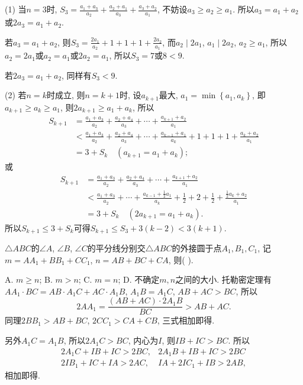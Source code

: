 (1) 当$n=3$时, $S_{3}=\frac{a_{1}+a_{3}}{a_{2}}+\frac{a_{2}+a_{1}}{a_{3}}+\frac{a_{3}+a_{2}}{a_{1}}$,
不妨设$a_{3}\ge a_{2}\ge a_{1}$. 所以$a_{3}=a_{1}+a_{2}$或$2a_{3}=a_{1}+a_{2}$.

若$a_{3}=a_{1}+a_{2}$, 则$S_{3}=\frac{2a_{1}}{a_{2}}+1+1+1+\frac{2a_{2}}{a_{1}}$,
而$a_{2}\mid2a_{1}$, $a_{1}\mid2a_{2}$, $a_{2}\ge a_{1}$, 所以$a_{2}=2a_{1}$或$a_{2}=a_{1}$或$2a_{2}=a_{1}$,
所以$S_{3}=7$或$8<9$.

若$2a_{3}=a_{1}+a_{2}$, 同样有$S_{3}<9$.

(2) 若$n=k$时成立, 则$n=k+1$时, 设$a_{k+1}$最大, $a_{1}=\min\left\{ a_{1},a_{k}\right\} $,
即$a_{k+1}\ge a_{k}\ge a_{1}$, 则$2a_{k+1}\ge a_{1}+a_{k}$, 所以
\[
\begin{aligned}S_{k+1} & =\frac{a_{1}+a_{3}}{a_{2}}+\frac{a_{2}+a_{4}}{a_{3}}+\cdots+\frac{a_{k+1}+a_{2}}{a_{1}}\\
 & <\frac{a_{1}+a_{3}}{a_{2}}+\frac{a_{2}+a_{4}}{a_{3}}+\cdots+\frac{a_{k-1}+a_{1}}{a_{k}}+1+1+1+\frac{a_{k}+a_{2}}{a_{1}}\\
 & =3+S_{k}\quad\left(a_{k+1}=a_{1}+a_{k}\right);
\end{aligned}
\]
或
\[
\begin{aligned}S_{k+1} & =\frac{a_{1}+a_{3}}{a_{2}}+\frac{a_{2}+a_{4}}{a_{3}}+\cdots+\frac{a_{k+1}+a_{2}}{a_{1}}\\
 & <\frac{a_{1}+a_{3}}{a_{2}}+\cdots+\frac{a_{k-1}+\frac{1}{2}a_{1}}{a_{k}}+\frac{1}{2}+2+\frac{1}{2}+\frac{\frac{1}{2}a_{k}+a_{2}}{a_{1}}\\
 & =3+S_{k}\quad\left(2a_{k+1}=a_{1}+a_{k}\right).
\end{aligned}
\]
所以$S_{k+1}\le3+S_{k}$可得$S_{k+1}\le S_{3}+3\left(k-2\right)<3\left(k+1\right)$.
\ea

\bq{}{}
$\triangle ABC$的$\angle A$, $\angle B$, $\angle C$的平分线分别交$\triangle ABC$的外接圆于点$A_{1},B_{1},C_{1}$,
记$m=AA_{1}+BB_{1}+CC_{1}$, $n=AB+BC+CA$, 则( ).

A. $m\ge n$; B. $m>n$; C. $m=n$; D. 不确定$m,n$之间的大小.
\eq
\ba
托勒密定理有$AA_{1}\cdot BC=AB\cdot A_{1}C+AC\cdot A_{1}B$, $A_{1}B=A_{1}C$,
$AB+AC>BC$, 所以
\[
2AA_{1}=\frac{\left(AB+AC\right)\cdot2A_{1}B}{BC}>AB+AC.
\]
同理$2BB_{1}>AB+BC$, $2CC_{1}>CA+CB$, 三式相加即得.

另外$A_{1}C=A_{1}B$, 所以$2A_{1}C>BC$, 内心为$I$, 则$IB+IC>BC$. 所以
\[
\begin{aligned}2A_{1}C+IB+IC>2BC, & 2A_{1}B+IB+IC>2BC\\
2IB_{1}+IC+IA>2AC, & IA+2IC_{1}+IB>2AB,
\end{aligned}
\]
相加即得.
\ea

